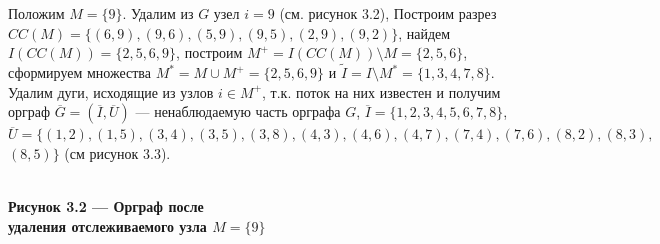 \documentclass[14pt]{extarticle}%
\begin{document}
Положим $M=\{9\}$. Удалим из $G$ узел $i=9$ (см. рисунок 3.2), Построим разрез $CC(M)=\{(6,9),(9,6),(5,9),(9,5),(2,9),(9,2)\}$, найдем $I(CC(M))=\{2,5,6,9\}$, построим $M^+=I(CC(M))\setminus M=\{2,5,6\}$, сформируем множества $M^*=M\cup M^+=\{2,5,6,9\}$ и $\widetilde{I}=I\setminus M^*=\{1,3,4,7,8\}$. Удалим дуги, исходящие из узлов $i\in M^+$, т.к. поток на них известен и получим орграф $\overline{G}=(\overline{I},\overline{U})$ --- ненаблюдаемую часть орграфа $G$, $\overline{I}=\{1,2,3,4,5,6,7,8\}$,\\ $\overline{U}=\{(1,2),(1,5),(3,4),(3,5),(3,8),(4,3),(4,6),(4,7),(7,4),(7,6),(8,2),(8,3),$ \\ $(8,5)\}$ (см рисунок 3.3).
\begin{center}
\\
\textbf{Рисунок 3.2 --- Орграф после \\удаления отслеживаемого узла $M=\{9\}$}
\end{center}
\end{document}
